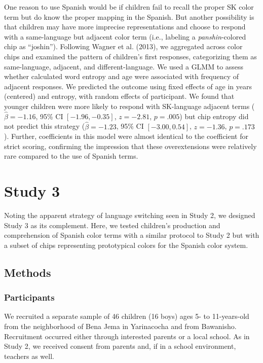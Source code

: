 \documentclass[
  english,
  ,man,floatsintext]{apa6}
\begin{document}
One reason to use Spanish would be if children fail to recall the proper SK color term but do know the proper mapping in the Spanish. But another possibility is that children may have more imprecise representations and choose to respond with a same-language but adjacent color term (i.e., labeling a \emph{panshin}-colored chip as \enquote{joshin}). Following Wagner et al. (2013), we aggregated across color chips and examined the pattern of children's first responses, categorizing them as same-language, adjacent, and different-language. We used a GLMM to assess whether calculated word entropy and age were associated with frequency of adjacent responses. We predicted the outcome using fixed effects of age in years (centered) and entropy, with random effects of participant. We found that younger children were more likely to respond with SK-language adjacent terms (\(\hat{\beta} = -1.16\), 95\% CI \([-1.96, -0.35]\), \(z = -2.81\), \(p = .005\)) but chip entropy did not predict this strategy (\(\hat{\beta} = -1.23\), 95\% CI \([-3.00, 0.54]\), \(z = -1.36\), \(p = .173\)). Further, coefficients in this model were almost identical to the coefficient for strict scoring, confirming the impression that these overextensions were relatively rare compared to the use of Spanish terms.

\hypertarget{study-3}{%
\section{Study 3}\label{study-3}}

Noting the apparent strategy of language switching seen in Study 2, we designed Study 3 as its complement. Here, we tested children's production and comprehension of Spanish color terms with a similar protocol to Study 2 but with a subset of chips representing prototypical colors for the Spanish color system.

\hypertarget{methods-2}{%
\subsection{Methods}\label{methods-2}}

\hypertarget{participants-2}{%
\subsubsection{Participants}\label{participants-2}}

We recruited a separate sample of 46 children (16 boys) ages 5- to 11-years-old from the neighborhood of Bena Jema in Yarinacocha and from Bawanisho. Recruitment occurred either through interested parents or a local school. As in Study 2, we received consent from parents and, if in a school environment, teachers as well.
\end{document}
